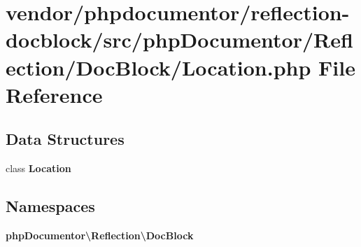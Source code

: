 \section{vendor/phpdocumentor/reflection-\/docblock/src/php\+Documentor/\+Reflection/\+Doc\+Block/\+Location.php File Reference}
\label{_location_8php}
\subsection*{Data Structures}
\begin{DoxyCompactItemize}
\item 
class {\bf Location}
\end{DoxyCompactItemize}
\subsection*{Namespaces}
\begin{DoxyCompactItemize}
\item 
 {\bf php\+Documentor\textbackslash{}\+Reflection\textbackslash{}\+Doc\+Block}
\end{DoxyCompactItemize}
